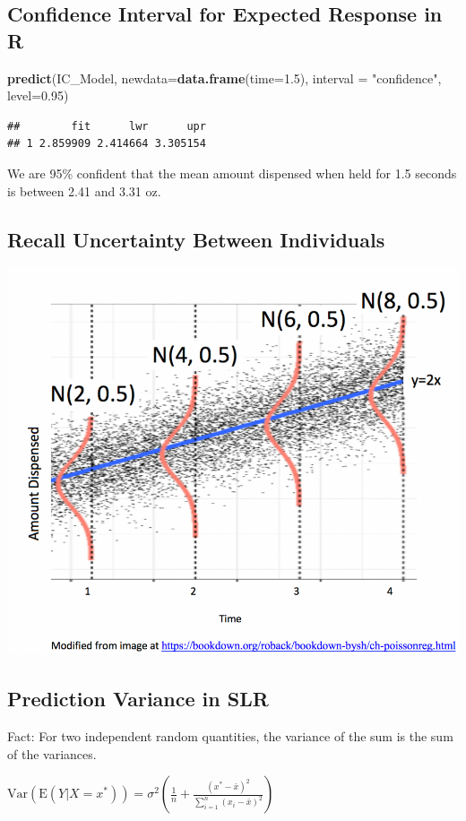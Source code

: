 \documentclass[]{book}
\newenvironment{Shaded}{\begin{snugshade}}{\end{snugshade}}
\newcommand{\KeywordTok}[1]{\textcolor[rgb]{0.13,0.29,0.53}{\textbf{#1}}}
\newcommand{\DataTypeTok}[1]{\textcolor[rgb]{0.13,0.29,0.53}{#1}}
\newcommand{\FloatTok}[1]{\textcolor[rgb]{0.00,0.00,0.81}{#1}}
\newcommand{\StringTok}[1]{\textcolor[rgb]{0.31,0.60,0.02}{#1}}
\newcommand{\NormalTok}[1]{#1}
\begin{document}
\subsection{Confidence Interval for Expected Response in
R}\label{confidence-interval-for-expected-response-in-r}

\begin{Shaded}
\begin{Highlighting}[]
\KeywordTok{predict}\NormalTok{(IC_Model, }\DataTypeTok{newdata=}\KeywordTok{data.frame}\NormalTok{(}\DataTypeTok{time=}\FloatTok{1.5}\NormalTok{), }\DataTypeTok{interval =} \StringTok{"confidence"}\NormalTok{, }\DataTypeTok{level=}\FloatTok{0.95}\NormalTok{)}
\end{Highlighting}
\end{Shaded}

\begin{verbatim}
##        fit      lwr      upr
## 1 2.859909 2.414664 3.305154
\end{verbatim}

We are 95\% confident that the mean amount dispensed when held for 1.5
seconds is between 2.41 and 3.31 oz.

\subsection{Recall Uncertainty Between
Individuals}\label{recall-uncertainty-between-individuals}

\includegraphics[width=0.5\linewidth]{SLR_Model_Assumptions}

\subsection{Prediction Variance in
SLR}\label{prediction-variance-in-slr}

Fact: For two independent random quantities, the variance of the sum is
the sum of the variances.

\(\text{Var}(\text{E}(Y|X=x^*))=\sigma^2\left(\frac{1}{n}+ \frac{(x^*-\bar{x})^2}{\displaystyle\sum_{i=1}^n(x_i-\bar{x})^2}\right)\)
\end{document}
